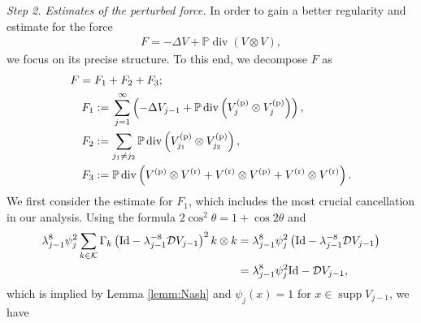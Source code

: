 \documentclass[a4paper,12pt,reqno]{amsart}
\theoremstyle{plain}
\theoremstyle{definition}
\renewcommand{\div}{\operatorname{div}}
\newcommand{\supp}{\operatorname{supp}}
\newcommand{\Id}{{\rm Id}}
\renewcommand{\sp}[1]{\left(#1\right)}
\begin{document}
\noindent
{\it Step 2. Estimates of the perturbed force.}
%
In order to gain a better regularity and estimate for the force 
\begin{align}
    F=-\Delta V + \mathbb{P} \div (V \otimes V),
\end{align}
we focus on its precise structure.
To this end, we decompose $F$ as
\begin{align}
    &
    F
    =
    F_1 + F_2 + F_3;
    \\
    &
    \quad
    F_1
    :={}
    \sum_{j=1}^{\infty}
    \sp{-\Delta V_{j-1} + \mathbb{P} \div \sp{V^{({\rm p})}_j \otimes V^{({\rm p})}_j}},
    \\
    &
    \quad
    F_2
    :=
    \sum_{j_1 \neq j_2} \mathbb{P} \div \sp{ V^{({\rm p})}_{j_1} \otimes V^{({\rm p})}_{j_2}},
    \\
    &
    \quad
    F_3
    :=
    \mathbb{P} \div \sp{ V^{({\rm p})} \otimes V^{({\rm r})} + V^{({\rm r})} \otimes V^{({\rm p})} + V^{({\rm r})} \otimes V^{({\rm r})}}.
\end{align}
We first consider the estimate for $F_1$, which includes the most crucial cancellation in our analysis.
Using the formula $2\cos^2\theta = 1+ \cos 2 \theta$ and
\begin{align}
    \lambda_{j-1}^{8}
    \psi_{j}^2
    \sum_{k \in \mathcal{K}}
    \Gamma_k\sp{\Id-\lambda_{j-1}^{-8}\mathcal{D}V_{j-1}}^2
    k \otimes k
    &
    =
    \lambda_{j-1}^{8}
    \psi_{j}^2
    \sp{\Id-\lambda_{j-1}^{-8}\mathcal{D}V_{j-1}}
    \\
    &
    =
    \lambda_{j-1}^{8}\psi_{j}^2\Id
    -
    \mathcal{D}V_{j-1},
\end{align}
which is implied by Lemma \ref{lemm:Nash} and $\psi_{j}(x)=1$ for $x \in \supp V_{j-1}$,
we have
\end{document}
